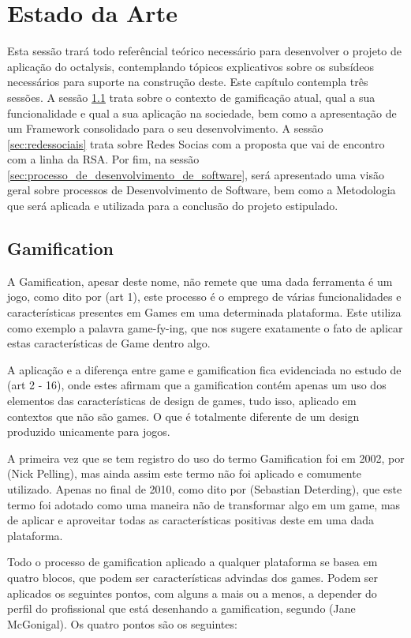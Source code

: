 \chapter[Estado da Arte]{Estado da Arte}
Esta sessão trará todo referêncial teórico necessário para desenvolver o projeto
de aplicação do octalysis, contemplando tópicos explicativos sobre os subsídeos
necessários para suporte na construção deste. Este capítulo contempla três sessões.
A sessão \ref{sec:gamification} trata sobre o contexto de gamificação atual, qual a
sua funcionalidade e qual a sua aplicação na sociedade, bem como a apresentação
de um Framework consolidado para o seu desenvolvimento. A sessão \ref{sec:redessociais}
trata sobre Redes Socias com a proposta que vai de encontro com a linha da RSA.
Por fim, na sessão \ref{sec:processo_de_desenvolvimento_de_software},
será apresentado uma visão geral sobre processos de
Desenvolvimento de Software, bem como a Metodologia que será aplicada e utilizada
para a conclusão do projeto estipulado.

\section{Gamification}
\label{sec:gamification}
A Gamification, apesar deste nome, não remete que uma dada ferramenta é um jogo,
como dito por (art 1), este processo é o emprego de
várias funcionalidades e características presentes em Games em uma determinada
plataforma. Este utiliza como exemplo a palavra game-fy-ing, que nos sugere
exatamente o fato de aplicar estas características de Game dentro algo.

A aplicação e a diferença entre game e gamification fica evidenciada
no estudo de (art 2 - 16), onde estes afirmam que a gamification contém  apenas
um uso dos elementos das características de design de games, tudo isso,
aplicado em contextos que não são games. O que é totalmente diferente
de um design produzido unicamente para jogos.

A primeira vez que se tem registro do uso do termo Gamification foi em 2002,
por (Nick Pelling), mas ainda assim este termo não foi aplicado e comumente
utilizado. Apenas no final de 2010, como dito por (Sebastian Deterding), que
este termo foi adotado como uma maneira não de transformar algo em um game,
mas de aplicar e aproveitar todas as características positivas deste em uma dada
plataforma.

Todo o processo de gamification aplicado a qualquer plataforma se basea em
quatro blocos, que podem ser características advindas dos games. Podem ser
aplicados os seguintes pontos, com alguns a mais ou a menos, a depender
do perfil do profissional que está desenhando a gamification, segundo (Jane McGonigal).
Os quatro pontos são os seguintes:

